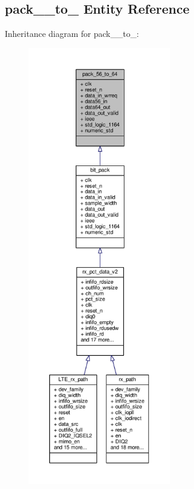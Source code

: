 \subsection{pack\+\_\+\_\+to\+\_ Entity Reference}
\label{classpack__56__to__64}


Inheritance diagram for pack\+\_\+\_\+to\+\_\+:\nopagebreak
\begin{figure}[H]
\begin{center}
\leavevmode
\includegraphics[height=550pt]{d1/d88/classpack__56__to__64__inherit__graph}
\end{center}
\end{figure}


